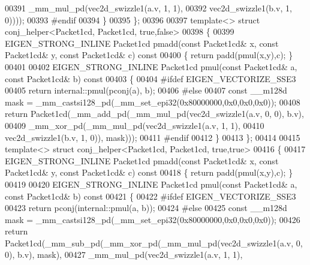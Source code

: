 \begin{DoxyCode}
00391                                 \_mm\_mul\_pd(vec2d\_swizzle1(a.v, 1, 1),
00392                                            vec2d\_swizzle1(b.v, 1, 0))));
00393 \textcolor{preprocessor}{    #endif}
00394   \}
00395 \};
00396 
00397 \textcolor{keyword}{template}<> \textcolor{keyword}{struct }conj\_helper<Packet1cd, Packet1cd, true,false>
00398 \{
00399   EIGEN\_STRONG\_INLINE Packet1cd pmadd(\textcolor{keyword}{const} Packet1cd& x, \textcolor{keyword}{const} Packet1cd& y, \textcolor{keyword}{const} Packet1cd& c)\textcolor{keyword}{ const}
00400 \textcolor{keyword}{  }\{ \textcolor{keywordflow}{return} padd(pmul(x,y),c); \}
00401 
00402   EIGEN\_STRONG\_INLINE Packet1cd pmul(\textcolor{keyword}{const} Packet1cd& a, \textcolor{keyword}{const} Packet1cd& b)\textcolor{keyword}{ const}
00403 \textcolor{keyword}{  }\{
00404 \textcolor{preprocessor}{    #ifdef EIGEN\_VECTORIZE\_SSE3}
00405     \textcolor{keywordflow}{return} internal::pmul(pconj(a), b);
00406 \textcolor{preprocessor}{    #else}
00407     \textcolor{keyword}{const} \_\_m128d mask = \_mm\_castsi128\_pd(\_mm\_set\_epi32(0x80000000,0x0,0x0,0x0));
00408     \textcolor{keywordflow}{return} Packet1cd(\_mm\_add\_pd(\_mm\_mul\_pd(vec2d\_swizzle1(a.v, 0, 0), b.v),
00409                                 \_mm\_xor\_pd(\_mm\_mul\_pd(vec2d\_swizzle1(a.v, 1, 1),
00410                                                       vec2d\_swizzle1(b.v, 1, 0)), mask)));
00411 \textcolor{preprocessor}{    #endif}
00412   \}
00413 \};
00414 
00415 \textcolor{keyword}{template}<> \textcolor{keyword}{struct }conj\_helper<Packet1cd, Packet1cd, true,true>
00416 \{
00417   EIGEN\_STRONG\_INLINE Packet1cd pmadd(\textcolor{keyword}{const} Packet1cd& x, \textcolor{keyword}{const} Packet1cd& y, \textcolor{keyword}{const} Packet1cd& c)\textcolor{keyword}{ const}
00418 \textcolor{keyword}{  }\{ \textcolor{keywordflow}{return} padd(pmul(x,y),c); \}
00419 
00420   EIGEN\_STRONG\_INLINE Packet1cd pmul(\textcolor{keyword}{const} Packet1cd& a, \textcolor{keyword}{const} Packet1cd& b)\textcolor{keyword}{ const}
00421 \textcolor{keyword}{  }\{
00422 \textcolor{preprocessor}{    #ifdef EIGEN\_VECTORIZE\_SSE3}
00423     \textcolor{keywordflow}{return} pconj(internal::pmul(a, b));
00424 \textcolor{preprocessor}{    #else}
00425     \textcolor{keyword}{const} \_\_m128d mask = \_mm\_castsi128\_pd(\_mm\_set\_epi32(0x80000000,0x0,0x0,0x0));
00426     \textcolor{keywordflow}{return} Packet1cd(\_mm\_sub\_pd(\_mm\_xor\_pd(\_mm\_mul\_pd(vec2d\_swizzle1(a.v, 0, 0), b.v), mask),
00427                                 \_mm\_mul\_pd(vec2d\_swizzle1(a.v, 1, 1),

\end{DoxyCode}
